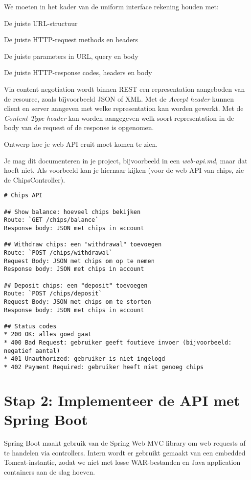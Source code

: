 We moeten in het kader van de uniform interface rekening houden met:
\begin{enumeration}
    \item De juiste URL-structuur
    \item De juiste HTTP-request methods en headers
    \item De juiste parameters in URL, query en body
    \item De juiste HTTP-response codes, headers en body
\end{enumeration}

Via content negotiation wordt binnen REST een representation 
aangeboden van de resource, zoals bijvoorbeeld JSON of XML. 
Met de \textit{Accept header} kunnen client en server aangeven 
met welke representation kan worden gewerkt. 
Met de \textit{Content-Type header} kan worden aangegeven 
welk soort representation in de body van de request of de response is opgenomen.

Ontwerp hoe je web API eruit moet komen te zien.

Je mag dit documenteren in je project,
bijvoorbeeld in een \textit{web-api.md}, maar dat hoeft niet.
Als voorbeeld kan je hiernaar kijken (voor de web API van chips, zie de ChipsController).
\begin{verbatim}
# Chips API

## Show balance: hoeveel chips bekijken
Route: `GET /chips/balance`
Response body: JSON met chips in account

## Withdraw chips: een "withdrawal" toevoegen
Route: `POST /chips/withdrawal`
Request Body: JSON met chips om op te nemen
Response body: JSON met chips in account

## Deposit chips: een "deposit" toevoegen
Route: `POST /chips/deposit`
Request Body: JSON met chips om te storten
Response body: JSON met chips in account

## Status codes
* 200 OK: alles goed gaat
* 400 Bad Request: gebruiker geeft foutieve invoer (bijvoorbeeld: negatief aantal)
* 401 Unauthorized: gebruiker is niet ingelogd 
* 402 Payment Required: gebruiker heeft niet genoeg chips
\end{verbatim}

\section{Stap 2: Implementeer de API met Spring Boot}
Spring Boot maakt gebruik van de Spring Web MVC library om web requests
af te handelen via controllers. 
Intern wordt er gebruikt gemaakt van een embedded Tomcat-instantie,
zodat we niet met losse WAR-bestanden en Java application containers aan de slag hoeven.

